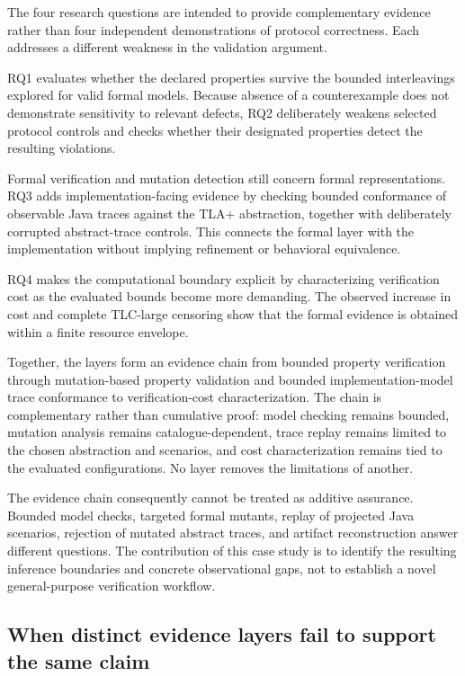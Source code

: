 The four research questions are intended to provide complementary evidence
rather than four independent demonstrations of protocol correctness. Each
addresses a different weakness in the validation argument.

RQ1 evaluates whether the declared properties survive the bounded
interleavings explored for valid formal models. Because absence of a
counterexample does not demonstrate sensitivity to relevant defects, RQ2
deliberately weakens selected protocol controls and checks whether their
designated properties detect the resulting violations.

Formal verification and mutation detection still concern formal
representations. RQ3 adds implementation-facing evidence by checking bounded
conformance of observable Java traces against the TLA+ abstraction, together with
deliberately corrupted abstract-trace controls. This connects the formal layer with the
implementation without implying refinement or behavioral equivalence.

RQ4 makes the computational boundary explicit by characterizing verification
cost as the evaluated bounds become more demanding. The observed increase in
cost and complete TLC-large censoring show that the formal evidence is obtained
within a finite resource envelope.

Together, the layers form an evidence chain from bounded property verification
through mutation-based property validation and bounded implementation-model
trace conformance to verification-cost characterization. The chain is
complementary rather than cumulative proof: model checking remains bounded,
mutation analysis remains catalogue-dependent, trace replay remains limited to
the chosen abstraction and scenarios, and cost characterization remains tied to
the evaluated configurations. No layer removes the limitations of another.

The evidence chain consequently cannot be treated as additive assurance.
Bounded model checks, targeted formal mutants, replay of projected Java
scenarios, rejection of mutated abstract traces, and artifact reconstruction
answer different questions. The contribution of this case study is to
identify the resulting inference boundaries and concrete observational gaps,
not to establish a novel general-purpose verification workflow.

\subsection{When distinct evidence layers fail to support the same claim}
\label{subsec:observation-adequacy}

